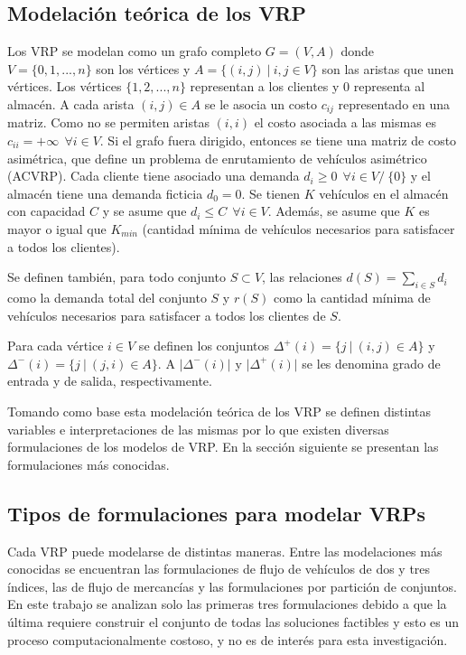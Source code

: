 \subsection{Modelación teórica de los VRP}\label{subsec:modelTeo}
Los VRP se modelan como un grafo completo $G = (V, A)$  donde $V = \{0, 1, ..., n\}$ son los vértices y $A = \{(i, j) \ |\ i, j \in V \}$ son las aristas que unen vértices. Los vértices $\{1, 2, ..., n\}$ representan a los clientes y $0$ representa al almacén. A cada arista $(i, j) \in A$ se le asocia un costo $c_{ij}$ representado en una matriz. Como no se permiten aristas $(i, i)$ el costo asociada a las mismas es $c_{ii} = +\infty \ \ \forall i \in V$. Si el grafo fuera dirigido, entonces se tiene una matriz de costo asimétrica, que define un problema de enrutamiento de vehículos asimétrico (ACVRP). Cada cliente tiene asociado una demanda $d_i \ge 0\ \ \forall i \in V /\ \{0\}$ y el almacén tiene una demanda ficticia $d_0 = 0$. Se tienen $K$ vehículos en el almacén con capacidad $C$ y se asume que $d_i \le C \ \ \forall i \in V$. Además, se asume que $K$ es mayor o igual que $K_{min}$ (cantidad mínima de vehículos necesarios para satisfacer a todos los clientes).

Se definen también, para todo conjunto $S\subset V$, las relaciones $d(S) = \sum_{i \in S} d_i$ como la demanda total del conjunto $S$ y $r(S)$ como la cantidad mínima de vehículos necesarios para satisfacer a todos los clientes de $S$.

Para cada vértice $i \in V$ se definen los conjuntos $\Delta^+(i) = \{j\ |\ (i, j) \in A\}$ y $\Delta^-(i) = \{j\ |\ (j, i) \in A\}$. A $\vert\Delta^-(i)\vert$ y $\vert\Delta^+(i)\vert$ se les denomina grado de entrada y de salida, respectivamente.

Tomando como base esta modelación teórica de los VRP se definen distintas variables e interpretaciones de las mismas por lo que existen diversas formulaciones de los modelos de VRP. En la sección siguiente se presentan las formulaciones más conocidas.

\subsection{Tipos de formulaciones para modelar VRPs}\label{subsec:modelTypes}

Cada VRP puede modelarse de distintas maneras. Entre las modelaciones más conocidas se encuentran las formulaciones de flujo de vehículos de dos y tres índices, las de flujo de mercancías y las formulaciones por partición de conjuntos. En este trabajo se analizan solo las primeras tres formulaciones debido a que la última requiere construir el conjunto de todas las soluciones factibles y esto es un proceso computacionalmente costoso, y no es de interés para esta investigación.

